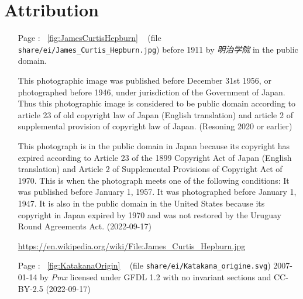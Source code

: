\chapter{Attribution}
\label{chap:attribution}

\begin{itemize}

    \item[Page \pageref{fig:JamesCurtisHepburn}:] ~\ref{fig:JamesCurtisHepburn}
            ~ (file
            \texttt{share/ei/James\_Curtis\_Hepburn.jpg}) before 1911 by
            \textit{明治学院} in the public domain.

            This photographic image was published before December 31st 1956, or
            photographed before 1946, under jurisdiction of the Government of
            Japan. Thus this photographic image is considered to be public
            domain according to article 23 of old copyright law of Japan
            (English translation) and article 2 of supplemental provision of
            copyright law of Japan. (Resoning 2020 or earlier)

            This photograph is in the public domain in Japan because its
            copyright has expired according to Article 23 of the 1899 Copyright
            Act of Japan (English translation) and Article 2 of Supplemental
            Provisions of Copyright Act of 1970. This is when the photograph
            meets one of the following conditions: It was published before
            January 1, 1957.  It was photographed before January 1, 1947.  It
            is also in the public domain in the United States because its
            copyright in Japan expired by 1970 and was not restored by the
            Uruguay Round Agreements Act. (2022-09-17)

            \url{https://en.wikipedia.org/wiki/File:James_Curtis_Hepburn.jpg}


    \item[Page \pageref{fig:KatakanaOrigin}:] ~\ref{fig:KatakanaOrigin}
            ~ (file
            \texttt{share/ei/Katakana\_origine.svg}) 2007-01-14 by \textit{Pmx}
            licensed under GFDL 1.2 with no invariant sections and CC-BY-2.5
            (2022-09-17)


\end{itemize}
